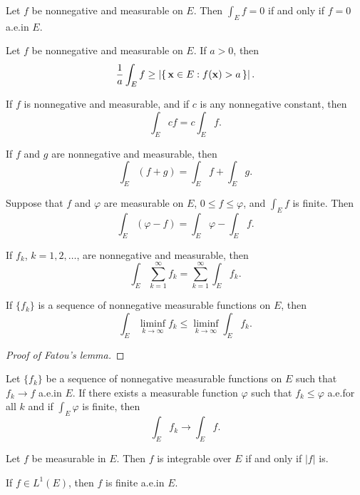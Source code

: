 \begin{theorem*}[5.11]
Let $f$ be nonnegative and measurable on $E$. Then $\int_E f=0$ if and only
if $f=0$ a.e.\@ in $E$.
\end{theorem*}
\begin{corollary*}
Let $f$ be nonnegative and measurable on $E$. If $a>0$, then
\[
\frac{1}{a}\int_E f\geq\left|\left\{\,\mathbf{x}\in E:f(\mathbf{x})>a\,\right\}\right|.
\]
\end{corollary*}
\begin{theorem*}[5.13]
If $f$ is nonnegative and measurable, and if $c$ is any nonnegative
constant, then
\[
\int_E cf=c\int_E f.
\]
\end{theorem*}
\begin{theorem*}[5.14]
If $f$ and $g$ are nonnegative and measurable, then
\[
\int_E (f+g)=\int_E f+\int_E g.
\]
\end{theorem*}
\begin{corollary*}
Suppose that $f$ and $\varphi$ are measurable on $E$, $0\leq f\leq\varphi$,
and $\int_E f$ is finite. Then
\[
\int_E (\varphi-f)=\int_E\varphi-\int_E f.
\]
\end{corollary*}
\begin{theorem*}[5.16]
If $f_k$, $k=1,2,\dotsc$, are nonnegative and measurable, then
\[
\int_E\sum_{k=1}^\infty f_k=\sum_{k=1}^\infty\int_E f_k.
\]
\end{theorem*}
\begin{theorem*}
If $\{f_k\}$ is a sequence of nonnegative measurable functions on $E$, then
\[
  \int_E\liminf_{k\to\infty} f_k\leq\liminf_{k\to\infty}\int_E f_k.
\]
\end{theorem*}
\begin{proof}[Proof of Fatou's lemma]
\end{proof}
\begin{theorem*}
Let $\{f_k\}$ be a sequence of nonnegative measurable functions on $E$ such
that $f_k\to f$ a.e.\@ in $E$. If there exists a measurable function
$\varphi$ such that $f_k\leq\varphi$ a.e.\@ for all $k$ and if
$\int_E\varphi$ is finite, then
\[
\int_E f_k\longrightarrow\int_E f.
\]
\end{theorem*}
\begin{theorem*}[5.21]
Let $f$ be measurable in $E$. Then $f$ is integrable over $E$ if and only
if $|f|$ is.
\end{theorem*}
\begin{theorem*}[5.22]
If $f\in L^1(E)$, then $f$ is finite a.e.\@ in $E$.
\end{theorem*}
